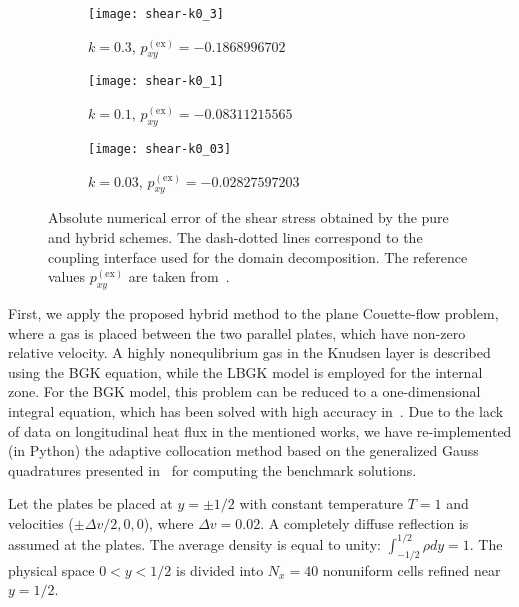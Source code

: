 \documentclass{elsarticle} %
\begin{document}
\begin{figure}
    \centering
    \begin{subfigure}[b]{0.33\textwidth}
        \texttt{[image: shear-k0\_3]}
        \caption{\(k=0.3\), \(p^\mathrm{(ex)}_{xy} = -0.1868996702\)}
        \label{fig:accuracy-k03}
    \end{subfigure}%
    \begin{subfigure}[b]{0.33\textwidth}
        \texttt{[image: shear-k0\_1]}
        \caption{\(k=0.1\), \(p^\mathrm{(ex)}_{xy} = -0.08311215565\)}
        \label{fig:accuracy-k01}
    \end{subfigure}%
    \begin{subfigure}[b]{0.33\textwidth}
        \texttt{[image: shear-k0\_03]}
        \caption{\(k=0.03\), \(p^\mathrm{(ex)}_{xy} = -0.02827597203\)}
        \label{fig:accuracy-k003}
    \end{subfigure}
    \caption{
        Absolute numerical error of the shear stress obtained by the pure and hybrid schemes.
        The dash-dotted lines correspond to the coupling interface used for the domain decomposition.
        The reference values \(p^\mathrm{(ex)}_{xy}\) are taken from~\cite{Luo2016}.
    }\label{fig:accuracy}
\end{figure}

First, we apply the proposed hybrid method to the plane Couette-flow problem,
where a gas is placed between the two parallel plates, which have non-zero relative velocity.
A highly nonequlibrium gas in the Knudsen layer is described using the BGK equation,
while the LBGK model is employed for the internal zone.
For the BGK model, this problem can be reduced to a one-dimensional integral equation,
which has been solved with high accuracy in~\cite{Luo2015, Luo2016}.
Due to the lack of data on longitudinal heat flux in the mentioned works, we have re-implemented (in Python)
the adaptive collocation method based on the generalized Gauss quadratures presented in~\cite{Luo2016}
for computing the benchmark solutions.

Let the plates be placed at \(y = \pm 1/2\) with constant temperature \(T = 1\) and velocities (\(\pm\Delta v/2,0,0\)),
where \(\Delta v=0.02\). A completely diffuse reflection is assumed at the plates.
The average density is equal to unity: \(\int_{-1/2}^{1/2}\rho dy=1\).
The physical space \(0 < y < 1/2\) is divided into \(N_x = 40\) nonuniform cells refined near \(y = 1/2\).
\end{document}
